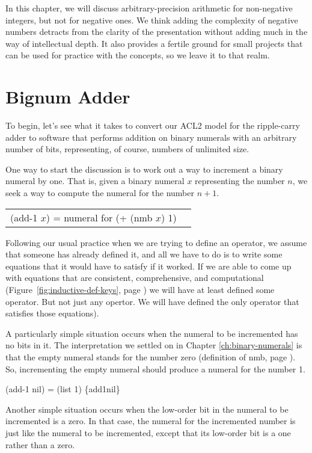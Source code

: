 In this chapter, we will discuss arbitrary-precision arithmetic
for non-negative integers,
but not for negative ones.
We think adding the complexity of negative numbers detracts from the clarity
of the presentation without adding much in the way of intellectual
depth. It also provides a fertile ground for small projects that
can be used for practice with the concepts, so we leave it to that realm.

\section{Bignum Adder}
\label{sec:bignum-adder}

To begin, let's see what it takes to convert our ACL2 model for
the ripple-carry adder to software that performs addition on
binary numerals with an arbitrary number of bits,
representing, of course, numbers of unlimited size.

One way to start the discussion is to work out a way to increment a
binary numeral by one. That is, given a binary numeral $x$ representing
the number $n$, we seek a way to compute the numeral for the number $n+1$.

\begin{tabular}{ll}
(add-1 $x$) = numeral for (+ (nmb $x$) 1)           & \\
\end{tabular}

Following our usual practice when we are trying to define an operator,
we assume that someone has already defined it,
and all we have to do is to write some equations that it
would have to satisfy if it worked. If we are able
to come up with equations that are consistent, comprehensive, and computational
(Figure~\ref{fig:inductive-def-keys}, page \pageref{fig:inductive-def-keys})
we will have at least defined some operator. But not just any opertor.
We will have defined the only operator
that satisfies those equations).

A particularly simple situation occurs when the numeral to be incremented
has no bits in it. The interpretation we settled on
in Chapter \ref{ch:binary-numerals} is that
the empty numeral stands for the number zero
(definition of nmb, page \pageref{nmb-defun}).
So, incrementing the empty numeral should produce a numeral for the number 1.

\hspace{1cm}(add-1 nil) = (list 1)  \hfill \{add1nil\}

Another simple situation occurs when the low-order bit in the
numeral to be incremented is a zero.
In that case, the numeral for the incremented number is
just like the numeral to be incremented, except that its
low-order bit is a one rather than a zero.


